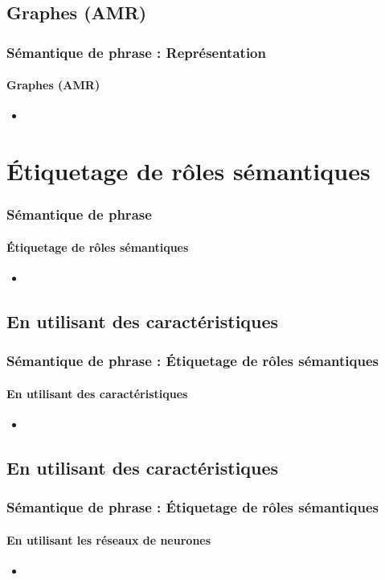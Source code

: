 \documentclass[xcolor=table]{beamer}
\begin{document}
\subsection{Graphes (AMR)}

\begin{frame}
	\frametitle{Sémantique de phrase : Représentation}
	\framesubtitle{Graphes (AMR)}
	
	\begin{itemize}
		\item 
	\end{itemize}
	
\end{frame}

\section{Étiquetage de rôles sémantiques}

\begin{frame}
	\frametitle{Sémantique de phrase}
	\framesubtitle{Étiquetage de rôles sémantiques}
	
	\begin{itemize}
		\item 
	\end{itemize}
	
\end{frame}

\subsection{En utilisant des caractéristiques}

\begin{frame}
	\frametitle{Sémantique de phrase : Étiquetage de rôles sémantiques}
	\framesubtitle{En utilisant des caractéristiques}
	
	\begin{itemize}
		\item 
	\end{itemize}
	
\end{frame}

\subsection{En utilisant des caractéristiques}

\begin{frame}
	\frametitle{Sémantique de phrase : Étiquetage de rôles sémantiques}
	\framesubtitle{En utilisant les réseaux de neurones}
	
	\begin{itemize}
		\item 
	\end{itemize}
	
\end{frame}

\end{document}
